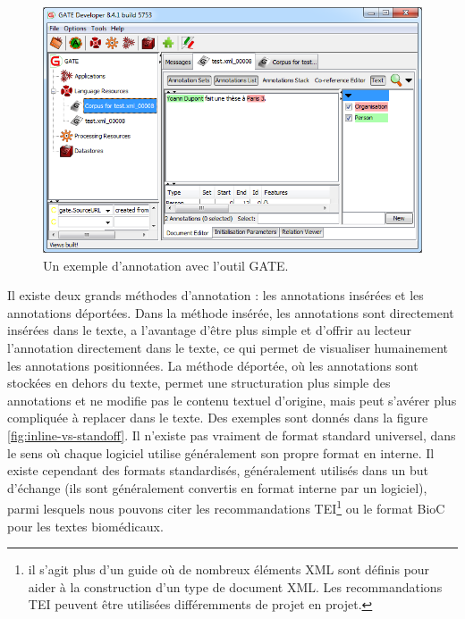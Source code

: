 \documentclass[PhD-Yoann-Dupont.tex]{subfiles}
\begin{document}
\begin{figure}[ht!]
    \centering
    \includegraphics[scale=0.66]{images/fort/GATE}
    \caption{Un exemple d'annotation avec l'outil GATE.}
    \label{fig:gate-annotation}
\end{figure}

Il existe deux grands méthodes d'annotation : les annotations insérées et les annotations déportées. Dans la méthode insérée, les annotations sont directement insérées dans le texte, a l'avantage d'être plus simple et d'offrir au lecteur l'annotation directement dans le texte, ce qui permet de visualiser humainement les annotations positionnées. La méthode déportée, où les annotations sont stockées en dehors du texte, permet une structuration plus simple des annotations et ne modifie pas le contenu textuel d'origine, mais peut s'avérer plus compliquée à replacer dans le texte. Des exemples sont donnés dans la figure \ref{fig:inline-vs-standoff}. Il n'existe pas vraiment de format standard universel, dans le sens où chaque logiciel utilise généralement son propre format en interne. Il existe cependant des formats standardisés, généralement utilisés dans un but d'échange (ils sont généralement convertis en format interne par un logiciel), parmi lesquels nous pouvons citer les recommandations TEI\footnote{il s'agit plus d'un guide où de nombreux éléments XML sont définis pour aider à la construction d'un type de document XML. Les recommandations TEI peuvent être utilisées différemments de projet en projet.} \citep{sperberg1994guidelines} ou le format BioC \citep{comeau2013bioc} pour les textes biomédicaux.
\end{document}
